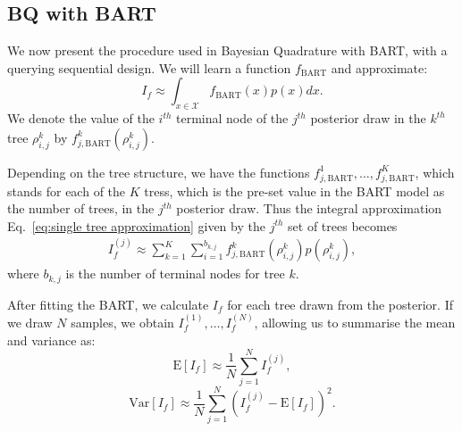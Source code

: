 
\subsection{BQ with BART}
We now present the procedure used in Bayesian Quadrature with BART, with a querying sequential design.
\label{BQ with BART}
We will learn a function $f_{\mbox{BART}}$ and approximate:
\begin{equation}
	I_f \approx \int_{x \in \mathcal{X}} f_{\mbox{BART}}(x) p(x) dx.
\label{eq:approx1}
\end{equation}
We denote the value of the $i^{th}$ terminal node of the $j^{th}$ posterior draw in the $k^{th}$ tree  $\rho_{i,j}^k$ by $f_{j,\mbox{BART}}^k(\rho_{i,j}^k)$. 

Depending on the tree structure, we have the functions $f^1_{j,\mbox{BART}},\ldots,f^K_{j,\mbox{BART}}$, which stands for each of the $K$ tress, which is the pre-set value in the BART model as the number of trees, in the $j^{th}$ posterior draw. Thus the integral approximation Eq.~\eqref{eq:single tree approximation} given by the $j^{th}$ set of trees becomes
\begin{align}
	I_f^{(j)} \approx \sum_{k=1}^{K}\sum_{i=1}^{b_{k,j}} f^k_{j,\mbox{BART}}(\rho_{i,j}^k) p(\rho_{i,j}^k),
\end{align}
where $b_{k,j}$ is the number of terminal nodes for tree $k$.

After fitting the BART, we calculate $I_f$ for each tree drawn from the posterior.
If we draw $N$ samples, we obtain $I_f^{(1)}, \ldots, I_f^{(N)}$, allowing us to summarise
the mean and variance as:
\begin{equation}
	\mbox{E}[I_f] \approx \frac{1}{N} \sum_{j=1}^{N} I_f^{(j)},
\end{equation}
\begin{equation}
	\mbox{Var}[I_f] \approx \frac{1}{N} \sum_{j=1}^N (I_f^{(j)} - \mbox{E}[I_f])^2.
\end{equation}

